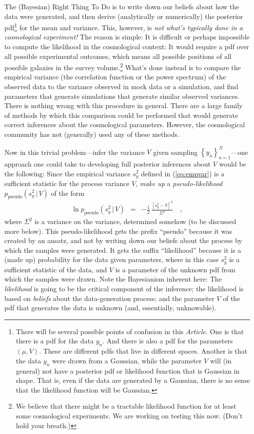 \documentclass[12pt, letterpaper, preprint]{aastex}
\newcommand{\setof}[1]{\left\{{#1}\right\}}
\newcommand{\given}{\,|\,}
\newcommand{\pseudo}{{\mathrm{pseudo}}}
\newcommand{\documentname}{\textsl{Article}}
\begin{document}
The (Bayesian) Right Thing To Do is to write down our beliefs about
how the data were generated, and then derive (analytically or
numerically) the posterior pdf\footnote{There will be several possible
  points of confusion in this \documentname. One is that there is a
  pdf for the data $y_n$. And there is also a pdf for the parameters
  $(\mu,V)$. These are different pdfs that live in different
  spaces. Another is that the data $y_n$ were drawn from a Gaussian,
  while the parameter $V$ will (in general) not have a
  posterior pdf  or likelihood function that is Gaussian in shape. That is, even if the data are
  generated by a Gaussian, there is no sense that the likelihood
  function will be Gaussian.} for the mean and
variance.
This, however, is \emph{not what's typically done in a cosmological
experiment!}
The reason is simple: It is difficult or perhaps impossible to compute
the likelihood in the cosmological context: It would require a pdf
over all possible experimental outcomes, which means all possible
positions of all possible galaxies in the survey volume.\footnote{We
  believe that there might be a tractable likelihood function for at
  least some cosmological experiments. We are working on testing this
  now. (Don't hold your breath.)}
What's done instead is to compare the empirical variance (the
correlation function or the power spectrum) of the observed data to
the variance observed in mock data or a simulation, and find
parameters that generate simulations that generate similar observed
variances.
There is nothing wrong with this procedure in general.  There are a
large family of methods by which this comparison could be performed
that would generate correct inferences about the cosmological
parameters.
However, the cosmological community has not (generally) used any of
these methods.

Now in this trivial problem---infer the variance $V$ given sampling
$\setof{y_n}_{n=1}^N$---one approach one could take to developing full
posterior inferences about $V$ would be the following:
Since the empirical variance $s^2_y$ defined in (\ref{eq:empvar})
is a sufficient statistic for the process variance $V$, \emph{make up}
a \emph{pseudo-likelihood} $p_\pseudo(s^2_y\given V)$ of the form
\begin{eqnarray}
\ln p_\pseudo(s^2_y\given V) &=& -\frac{1}{2}\,\frac{[s^2_y - V]^2}{\Sigma^2}
\label{eq:pseudo}\quad ,
\end{eqnarray}
where $\Sigma^2$ is a variance on the variance, determined somehow (to
be discussed more below).
This pseudo-likelihood gets the prefix ``pseudo'' because it was
created by an ansatz, and not by writing down our beliefs about the
process by which the samples were generated.
It gets the suffix ``likelihood'' because it is a (made up)
probability for the data given parameters, where in this case
$s^2_y$ is a sufficient statistic of the data, and $V$ is a
parameter of the unknown pdf from which the samples were drawn.
Note the Bayesianism inherent here:
The \emph{likelihood} is going to be the critical component of the
inference; the likelihood is based on \emph{beliefs} about the
data-generation process; and the parameter $V$ of the pdf that
generates the data is unknown (and, essentially, unknowable).
\end{document}

